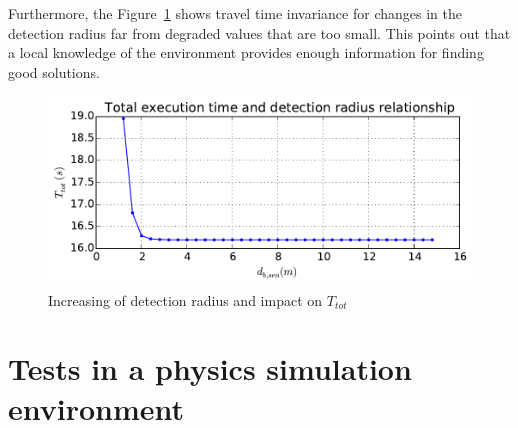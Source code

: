 Furthermore, the Figure~\ref{fig:drhotot} shows travel time
invariance for changes in the detection radius far from degraded values that are too small.
This points out that a local knowledge of the environment provides enough information for finding good solutions.
\begin{figure}[!h]\centering
  \includegraphics[width=.45\linewidth]{./images/drho/drho-tot.pdf}
  \caption{Increasing of detection radius and impact on
  $T_{tot}$\label{fig:drhotot}}
\end{figure}



\section{Tests in a physics simulation environment}

